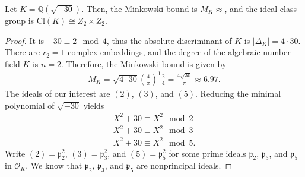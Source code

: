 \begin{exmbox}
    \begin{example}
        Let \(K = \mathbb{Q}(\sqrt{-30})\). Then, the Minkowski bound is \(M_K \approx \), and the ideal class group is \(\mathrm{Cl}(K) \cong Z_2 \times Z_2\).
    \end{example}
\end{exmbox}
\begin{proof}
    It is \(-30 \equiv 2 \mod{4}\), thus the absolute discriminant of \(K\) is \(|\Delta_K| = 4 \cdot 30\). There are \(r_2 = 1\) complex embeddings, and the degree of the algebraic number field \(K\) is \(n = 2\). Therefore, the Minkowski bound is given by
    \begin{align*}
        M_K = \sqrt{4 \cdot 30} \left(\frac{4}{\pi}\right)^1 \frac{2}{4} = \frac{4 \sqrt{30}}{\pi} \approx 6.97 \text{.}
    \end{align*}
    The ideals of our interest are \((2)\), \((3)\), and \((5)\). Reducing the minimal polynomial of \(\sqrt{-30}\) yields
    \begin{align*}
        X^2 + 30 \equiv X^2 \mod{2} \\
        X^2 + 30 \equiv X^2 \mod{3} \\
        X^2 + 30 \equiv X^2 \mod{5} \text{.}
    \end{align*}
    Write \((2) = \mathfrak{p}_2^2\), \((3) = \mathfrak{p}_3^2\), and \((5) = \mathfrak{p}_5^2\) for some prime ideals \(\mathfrak{p}_2\), \(\mathfrak{p}_3\), and \(\mathfrak{p}_5\) in \(\mathcal{O}_K\). We know that \(\mathfrak{p}_2\), \(\mathfrak{p}_3\), and \(\mathfrak{p}_5\) are nonprincipal ideals.
\end{proof}

